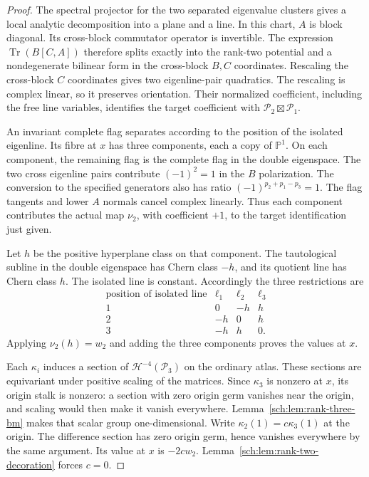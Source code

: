 \begin{proof}
The spectral projector for the two separated eigenvalue clusters
gives a local analytic decomposition into a plane and a line.
In this chart, $A$ is block diagonal. Its cross-block commutator
operator is invertible. The expression $\operatorname{Tr}(B[C,A])$
therefore splits exactly into the rank-two potential and a
nondegenerate bilinear form in the cross-block $B,C$ coordinates.
Rescaling the cross-block $C$ coordinates gives two eigenline-pair
quadratics. The rescaling is complex linear, so it preserves orientation.
Their normalized coefficient, including the free line variables,
identifies the target coefficient with $\mathcal P_2\boxtimes\mathcal P_1$.

An invariant complete flag separates according to the position of
the isolated eigenline. Its fibre at $x$ has three components,
each a copy of $\mathbb P^1$. On each component, the remaining
flag is the complete flag in the double eigenspace.
The two cross eigenline pairs contribute $(-1)^2=1$ in the
$B$ polarization. The conversion to the specified generators also
has ratio $(-1)^{p_2+p_1-p_3}=1$.
The flag tangents and lower $A$ normals cancel complex linearly.
Thus each component contributes the actual map $\nu_2$, with
coefficient $+1$, to the target identification just given.

Let $h$ be the positive hyperplane class on that component.
The tautological subline in the double eigenspace has Chern class
$-h$, and its quotient line has Chern class $h$.
The isolated line is constant. Accordingly the three restrictions are
\[
\begin{array}{c|ccc}
 \text{position of isolated line}&\ell_1&\ell_2&\ell_3\\\hline
 1&0&-h&h\\
 2&-h&0&h\\
 3&-h&h&0.
\end{array}
\]
Applying $\nu_2(h)=w_2$ and adding the three components proves
the values at $x$.

Each $\kappa_i$ induces a section of
$\mathcal H^{-4}(\mathcal P_3)$ on the ordinary atlas.
These sections are equivariant under positive scaling of the matrices.
Since $\kappa_3$ is nonzero at $x$, its origin stalk is nonzero:
a section with zero origin germ vanishes near the origin, and scaling
would then make it vanish everywhere.
Lemma~\ref{sch:lem:rank-three-bm} makes that scalar group one-dimensional.
Write $\kappa_2(1)=c\kappa_3(1)$ at the origin.
The difference section has zero origin germ, hence vanishes everywhere
by the same argument. Its value at $x$ is $-2c w_2$.
Lemma~\ref{sch:lem:rank-two-decoration} forces $c=0$.
\end{proof}

